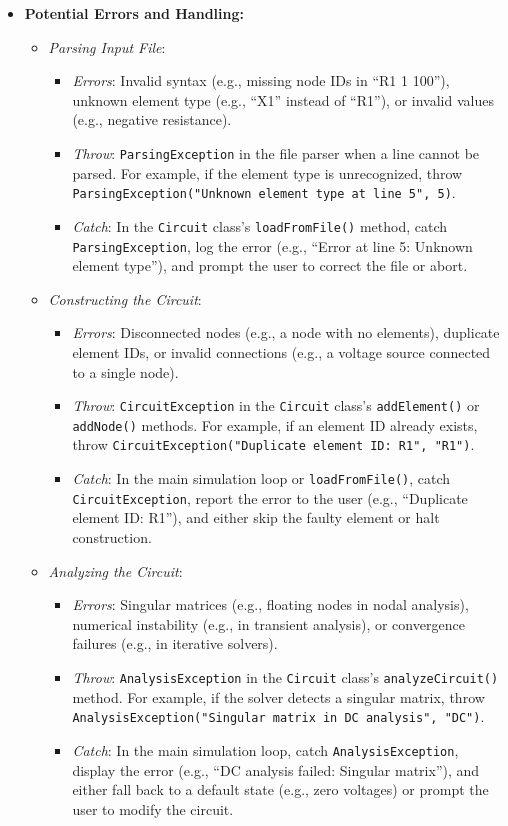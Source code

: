 \documentclass{article}
\begin{document}
\begin{itemize}
    \item \textbf{Potential Errors and Handling:}
    \begin{itemize}
        \item \textit{Parsing Input File}:
        \begin{itemize}
            \item \textit{Errors}: Invalid syntax (e.g., missing node IDs in “R1 1 100”), unknown element type (e.g., “X1” instead of “R1”), or invalid values (e.g., negative resistance).
            \item \textit{Throw}: \texttt{ParsingException} in the file parser when a line cannot be parsed. For example, if the element type is unrecognized, throw \texttt{ParsingException("Unknown element type at line 5", 5)}.
            \item \textit{Catch}: In the \texttt{Circuit} class’s \texttt{loadFromFile()} method, catch \texttt{ParsingException}, log the error (e.g., “Error at line 5: Unknown element type”), and prompt the user to correct the file or abort.
        \end{itemize}
        \item \textit{Constructing the Circuit}:
        \begin{itemize}
            \item \textit{Errors}: Disconnected nodes (e.g., a node with no elements), duplicate element IDs, or invalid connections (e.g., a voltage source connected to a single node).
            \item \textit{Throw}: \texttt{CircuitException} in the \texttt{Circuit} class’s \texttt{addElement()} or \texttt{addNode()} methods. For example, if an element ID already exists, throw \texttt{CircuitException("Duplicate element ID: R1", "R1")}.
            \item \textit{Catch}: In the main simulation loop or \texttt{loadFromFile()}, catch \texttt{CircuitException}, report the error to the user (e.g., “Duplicate element ID: R1”), and either skip the faulty element or halt construction.
        \end{itemize}
        \item \textit{Analyzing the Circuit}:
        \begin{itemize}
            \item \textit{Errors}: Singular matrices (e.g., floating nodes in nodal analysis), numerical instability (e.g., in transient analysis), or convergence failures (e.g., in iterative solvers).
            \item \textit{Throw}: \texttt{AnalysisException} in the \texttt{Circuit} class’s \texttt{analyzeCircuit()} method. For example, if the solver detects a singular matrix, throw \texttt{AnalysisException("Singular matrix in DC analysis", "DC")}.
            \item \textit{Catch}: In the main simulation loop, catch \texttt{AnalysisException}, display the error (e.g., “DC analysis failed: Singular matrix”), and either fall back to a default state (e.g., zero voltages) or prompt the user to modify the circuit.
        \end{itemize}
    \end{itemize}


\end{itemize}
\end{document}
